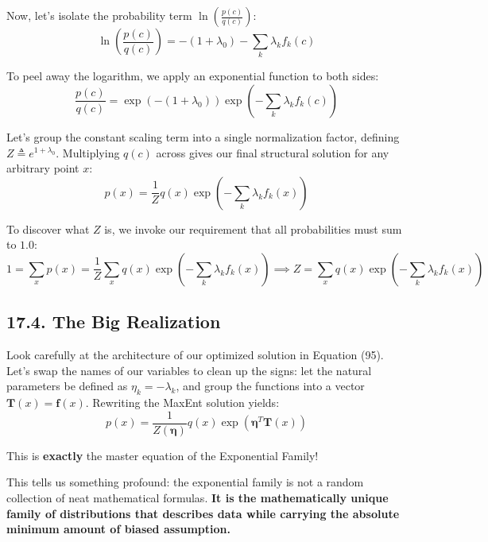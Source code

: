 \documentclass{article}
\begin{document}
Now, let's isolate the probability term $\ln\left(\frac{p(c)}{q(c)}\right)$:
\begin{equation}
\ln\left(\frac{p(c)}{q(c)}\right) = -(1 + \lambda_0) - \sum_k \lambda_k f_k(c) \tag{93}
\end{equation}

To peel away the logarithm, we apply an exponential function to both sides:
\begin{equation}
\frac{p(c)}{q(c)} = \exp\left(-(1 + \lambda_0)\right) \exp\left(-\sum_k \lambda_k f_k(c)\right) \tag{94}
\end{equation}

Let's group the constant scaling term into a single normalization factor, defining $Z \triangleq e^{1 + \lambda_0}$. Multiplying $q(c)$ across gives our final structural solution for any arbitrary point $x$:
\begin{equation}
p(x) = \frac{1}{Z} q(x) \exp\left( -\sum_k \lambda_k f_k(x) \right) \tag{95}
\end{equation}

To discover what $Z$ is, we invoke our requirement that all probabilities must sum to $1.0$:
\begin{equation}
1 = \sum_x p(x) = \frac{1}{Z} \sum_x q(x) \exp\left( -\sum_k \lambda_k f_k(x) \right) \implies Z = \sum_x q(x) \exp\left( -\sum_k \lambda_k f_k(x) \right) \tag{96}
\end{equation}

\subsection*{17.4. The Big Realization}
Look carefully at the architecture of our optimized solution in Equation (95). Let's swap the names of our variables to clean up the signs: let the natural parameters be defined as $\eta_k = -\lambda_k$, and group the functions into a vector $\mathbf{T}(x) = \mathbf{f}(x)$. Rewriting the MaxEnt solution yields:
\begin{equation}
p(x) = \frac{1}{Z(\boldsymbol{\eta})} q(x) \exp\left( \boldsymbol{\eta}^T \mathbf{T}(x) \right) \tag{97}
\end{equation}

This is \textbf{exactly} the master equation of the Exponential Family! 

This tells us something profound: the exponential family is not a random collection of neat mathematical formulas. \textbf{It is the mathematically unique family of distributions that describes data while carrying the absolute minimum amount of biased assumption.}
\end{document}

